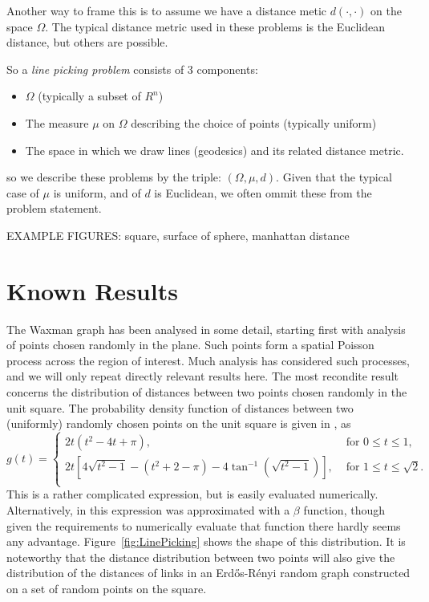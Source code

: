 \documentclass{article}
\begin{document}
Another way to frame this is to assume we have a distance metic
$d(\cdot, \cdot)$ on the space $\Omega$. The typical distance metric
used in these problems is the Euclidean distance, but others are
possible.

So a {\em line picking problem} consists of 3 components:
\begin{itemize}

\item $\Omega$ (typically a subset of $R^n$)

\item The measure $\mu$ on $\Omega$ describing the choice of points
  (typically uniform)

\item The space in which we draw lines (geodesics) and its related
  distance metric.

\end{itemize}
so we describe these problems by the triple: $(\Omega, \mu, d)$. Given
that the typical case of $\mu$ is uniform, and of $d$ is Euclidean, we
often ommit these from the problem statement.

EXAMPLE FIGURES: square, surface of sphere, manhattan distance


\section{Known Results}
\label{sec:known}


The Waxman graph has been analysed in some detail, starting first with
analysis of points chosen randomly in the plane. Such points form a
spatial Poisson process across the region of interest. Much analysis
has considered such processes, and we will only repeat directly
relevant results here. The most recondite result concerns the
distribution of distances between two points chosen randomly in the
unit square.  The probability density function of distances between
two (uniformly) randomly chosen points on the unit square is given in
\cite{weisstein:_squar_line_picking}, as
\begin{equation}
  \label{eq:square_line}
  g(t) = \left\{ \begin{array}{ll}
      2t (t^2-4t+\pi), & \mbox{ for } 0 \leq t \leq 1, \\
      2t \left[4 \sqrt{t^2-1} - (t^2+2-\pi) - 4 \tan^{-1} \left(\sqrt{t^2-1} \right)\right], 
               & \mbox{ for } 1 \leq t \leq \sqrt{2} . \\ 
    \end{array} \right.
\end{equation}
This is a rather complicated expression, but is easily evaluated
numerically. Alternatively, in
\cite{m.naldi05:_connec_of_waxman_graph} this expression was
approximated with a $\beta$ function, though given the requirements to
numerically evaluate that function there hardly seems any advantage.
Figure~\ref{fig:LinePicking} shows the shape of this distribution.
It is noteworthy that the distance distribution between two points
will also give the distribution of the distances of links in an
Erd\H{o}s-R\'enyi random graph constructed on a set of random points
on the square.
\end{document}
